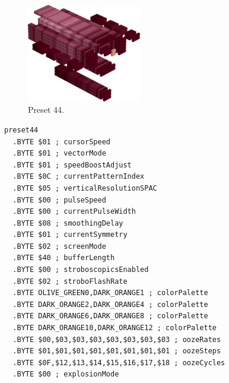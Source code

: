 \vspace*{0.5cm}
\begin{minipage}[b]{0.48\linewidth}
\begin{figure}[H]                                                          
  \centering                                                             
  \begin{adjustbox}{width=5cm,center}                                   
  \includegraphics[width=5cm]{src/colorspace_presets/preset44-45.png}%
  \end{adjustbox}                                                        
\caption*{Preset 44.}                                           
\end{figure}                                                               
\end{minipage}
\hspace{0.1cm}
\begin{minipage}[b]{0.48\linewidth}                                                                         
\begin{lstlisting}[basicstyle=\ttfamily\tiny]
preset44
  .BYTE $01 ; cursorSpeed
  .BYTE $01 ; vectorMode
  .BYTE $01 ; speedBoostAdjust
  .BYTE $0C ; currentPatternIndex
  .BYTE $05 ; verticalResolutionSPAC
  .BYTE $00 ; pulseSpeed
  .BYTE $00 ; currentPulseWidth
  .BYTE $08 ; smoothingDelay
  .BYTE $01 ; currentSymmetry
  .BYTE $02 ; screenMode
  .BYTE $40 ; bufferLength
  .BYTE $00 ; stroboscopicsEnabled
  .BYTE $02 ; stroboFlashRate
  .BYTE OLIVE_GREEN0,DARK_ORANGE1 ; colorPalette
  .BYTE DARK_ORANGE2,DARK_ORANGE4 ; colorPalette
  .BYTE DARK_ORANGE6,DARK_ORANGE8 ; colorPalette
  .BYTE DARK_ORANGE10,DARK_ORANGE12 ; colorPalette
  .BYTE $00,$03,$03,$03,$03,$03,$03,$03 ; oozeRates
  .BYTE $01,$01,$01,$01,$01,$01,$01,$01 ; oozeSteps
  .BYTE $0F,$12,$13,$14,$15,$16,$17,$18 ; oozeCycles
  .BYTE $00 ; explosionMode
\end{lstlisting}
\end{minipage}


